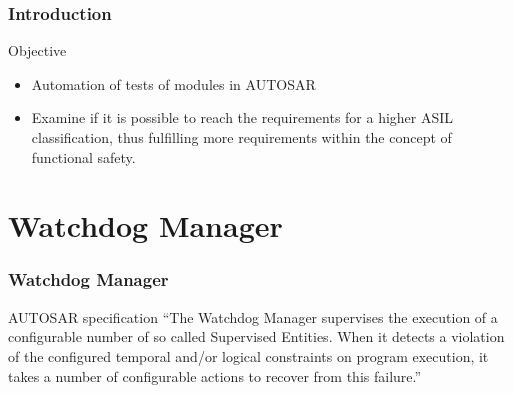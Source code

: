 \documentclass{beamer}
\begin{document}
\begin{frame}[fragile]
  \frametitle{Introduction}
  \begin{block}{Objective}
    \begin{itemize}
        \item Automation of tests of modules in AUTOSAR
        \item Examine if it is possible to reach the requirements for
          a higher ASIL classification, thus fulfilling more
          requirements within the concept of functional safety.
    \end{itemize}
   \end{block}
\end{frame}


\section{Watchdog Manager}

\begin{frame}
  \frametitle{Watchdog Manager}
  \begin{block}{AUTOSAR specification}
    ``The Watchdog Manager supervises the execution of a configurable
    number of so called Supervised Entities. When it detects a violation
    of the configured temporal and/or logical constraints on program
    execution, it takes a number of configurable actions to recover from
    this failure.''
  \end{block}
\end{frame}

\end{document}
